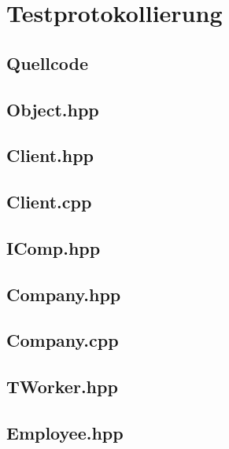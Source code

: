 \documentclass[12pt,naustrian,a4widepaper]{scrartcl}
\begin{document}
\clearpage
\section{Testprotokollierung}


\clearpage
{}
\begin{landscape}

	\section{Quellcode}
	
	\subsection{Object.hpp}
	
	\clearpage
	\subsection{Client.hpp}
	
	\clearpage
	\subsection{Client.cpp}
	
	
	\clearpage
	\subsection{IComp.hpp}
	
	
	\clearpage
	\subsection{Company.hpp}
	
	\clearpage
	\subsection{Company.cpp}
	
	
	\clearpage
	\subsection{TWorker.hpp}
	
	
	\clearpage
	\subsection{Employee.hpp}
	
	\clearpage

\end{landscape}
\end{document}
